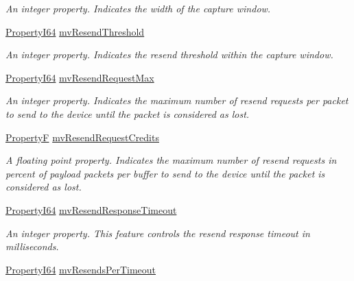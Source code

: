 \begin{DoxyCompactItemize}
\begin{DoxyCompactList}\small\item\em An integer property. Indicates the width of the capture window. \end{DoxyCompactList}\item 
\hyperlink{group___common_interface_ga81749b2696755513663492664a18a893}{Property\+I64} \hyperlink{classmv_i_m_p_a_c_t_1_1acquire_1_1_gen_i_cam_1_1_data_stream_module_af464f44e350a2ca19f84dcc19b6f05b8}{mv\+Resend\+Threshold}
\begin{DoxyCompactList}\small\item\em An integer property. Indicates the resend threshold within the capture window. \end{DoxyCompactList}\item 
\hyperlink{group___common_interface_ga81749b2696755513663492664a18a893}{Property\+I64} \hyperlink{classmv_i_m_p_a_c_t_1_1acquire_1_1_gen_i_cam_1_1_data_stream_module_a94debea1582b53ca02fdb929286313d9}{mv\+Resend\+Request\+Max}
\begin{DoxyCompactList}\small\item\em An integer property. Indicates the maximum number of resend requests per packet to send to the device until the packet is considered as lost. \end{DoxyCompactList}\item 
\hyperlink{group___common_interface_gaf54865fe5a3d5cfd15f9a111b40d09f9}{Property\+F} \hyperlink{classmv_i_m_p_a_c_t_1_1acquire_1_1_gen_i_cam_1_1_data_stream_module_a66859d673975f0f4e4bebe6d3e780c45}{mv\+Resend\+Request\+Credits}
\begin{DoxyCompactList}\small\item\em A floating point property. Indicates the maximum number of resend requests in percent of payload packets per buffer to send to the device until the packet is considered as lost. \end{DoxyCompactList}\item 
\hyperlink{group___common_interface_ga81749b2696755513663492664a18a893}{Property\+I64} \hyperlink{classmv_i_m_p_a_c_t_1_1acquire_1_1_gen_i_cam_1_1_data_stream_module_a2fc39b5e76055a6f344fb90c3fdb0b0f}{mv\+Resend\+Response\+Timeout}
\begin{DoxyCompactList}\small\item\em An integer property. This feature controls the resend response timeout in milliseconds. \end{DoxyCompactList}\item 
\hyperlink{group___common_interface_ga81749b2696755513663492664a18a893}{Property\+I64} \hyperlink{classmv_i_m_p_a_c_t_1_1acquire_1_1_gen_i_cam_1_1_data_stream_module_a55cb9733b226b2dd8608573f0f9c16f1}{mv\+Resends\+Per\+Timeout}

\end{DoxyCompactItemize}
